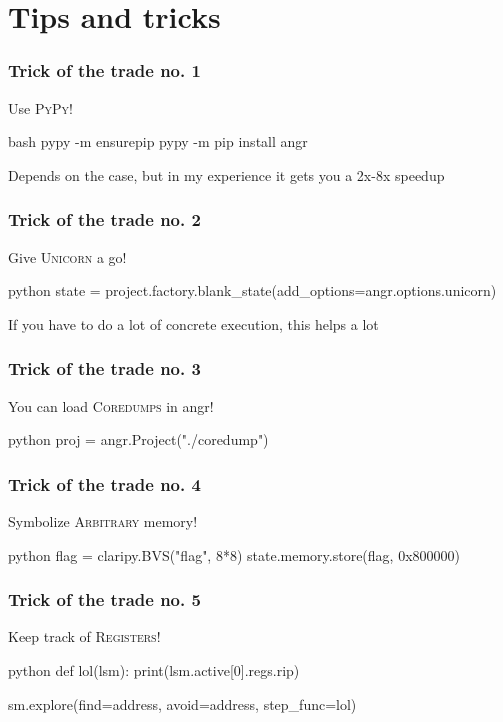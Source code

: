 \documentclass[aspectratio=169]{beamer}
\begin{document}
\section{Tips and tricks}
\begin{frame}[fragile]
	\frametitle{Trick of the trade no. 1}
	\begin{center}
	{\Large Use \textsc{PyPy}!}
	\end{center}

	\begin{codebox}{bash}
pypy -m ensurepip
pypy -m pip install angr\end{codebox}
	\pause

	Depends on the case, but in my experience it gets you a 2x-8x speedup
\end{frame}


\begin{frame}[fragile]
	\frametitle{Trick of the trade no. 2}
	\begin{center}
	{\Large Give \textsc{Unicorn} a go!}
	\end{center}
	\begin{codebox}{python}
state = project.factory.blank_state(add_options=angr.options.unicorn)\end{codebox}
	\pause

	If you have to do a lot of concrete execution, this helps a lot
\end{frame}


\begin{frame}[fragile]
	\frametitle{Trick of the trade no. 3}
	\begin{center}
		{\Large You can load \textsc{Coredumps} in angr!}
	\end{center}
	\begin{codebox}{python}
proj = angr.Project("./coredump")\end{codebox}
\end{frame}


\begin{frame}[fragile]
	\frametitle{Trick of the trade no. 4}
	\begin{center}
		{\Large Symbolize \textsc{Arbitrary} memory!}
	\end{center}
	\begin{codebox}{python}
flag = claripy.BVS("flag", 8*8)
state.memory.store(flag, 0x800000)\end{codebox}
\end{frame}


\begin{frame}[fragile]
	\frametitle{Trick of the trade no. 5}
	\begin{center}
		{\Large Keep track of \textsc{Registers}!}
	\end{center}
	\begin{codebox}{python}
def lol(lsm):
	print(lsm.active[0].regs.rip)

sm.explore(find=address, avoid=address, step_func=lol)\end{codebox}
\end{frame}
\end{document}
